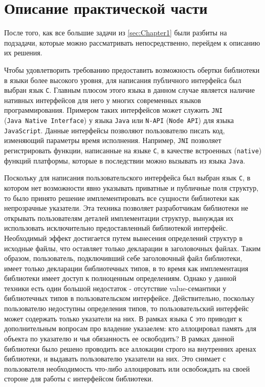 \section{Описание практической части}
\label{sec:Chapter4} 

После того, как все большие задачи из \autoref{sec:Chapter1} были разбиты на подзадачи, которые можно рассматривать непосредственно, перейдем к описанию их решения.

Чтобы удовлетворить требованию предоставить возможность обертки библиотеки в языки более высокого уровня, для написания публичного интерфейса был выбран язык \texttt{C}. Главным плюсом этого языка в данном случае является наличие нативных интерфейсов для него у многих современных языков программирования. Примером таких интерфейсов может служить \texttt{JNI} (\texttt{Java~Native~Interface}) \cite{jni} у языка \texttt{Java} или \texttt{N-API} (\texttt{Node~API}) \cite{napi} для языка \texttt{JavaScript}. Данные интерфейсы позволяют пользователю писать код, изменяющий параметры время исполнения. Например, \texttt{JNI} позволяет регистрировать функции, написанные на языке \texttt{C}, в качестве встроенных (\texttt{native}) функций платформы, которые в последствии можно вызывать из языка \texttt{Java}.

Поскольку для написания пользовательского интерфейса был выбран язык \texttt{C}, в котором нет возможности явно указывать приватные и публичные поля структур, то было принято решение имплементировать все сущности библиотеки как непрозрачные указатели. Эта техника позволяет разработчикам библиотеки не открывать пользователям деталей имплементации структур, вынуждая их использовать исключительно предоставленный библиотекой интерфейс. Необходимый эффект достигается путем вынесения определений структур в исходные файлы, что оставляет только декларации в заголовочных файлах. Таким образом, пользователь, подключивший себе заголовочный файл библиотеки, имеет только декларации библиотечных типов, в то время как имплементация библиотеки имеет доступ к полноценным определениям. Однако у данной техники есть один большой недостаток - отсутствие value-семантики у библиотечных типов в пользовательском интерфейсе. Действительно, поскольку пользователю недоступны определения типов, то пользовательский интерфейс может содержать только указатели на них. В рамках языка \texttt{C} это приводит к дополнительным вопросам про владение указаелем: кто аллоцировал память для объекта по указателю и чья обязанность ее освободить? В рамках данной библиотеки было решено проводить все аллокации строго на внутренних аренах библиотеки, и выдавать пользователю указатели на них. Это снимает с пользователя необходимость что-либо аллоцировать или освобождать на своей стороне для работы с интерфейсом библиотеки.

